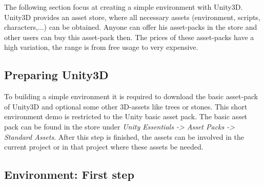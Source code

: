 \documentclass[conference]{IEEEtran}
\begin{document}
The following section focus at creating a simple environment with Unity3D. 
Unity3D provides an asset store, where all necessary assets (environment, scripts, characters,...) can be obtained. Anyone can offer his asset-packs in the store and other users can buy this asset-pack then. The prices of these asset-packs have a high variation, the range is from free usage to very expensive. 

\subsection{Preparing Unity3D}

To building a simple environment it is required to download the basic asset-pack of Unity3D and optional some other 3D-assets like trees or stones. This short environment demo is restricted to the Unity basic asset pack. The basic asset pack can be found in the store under \emph{Unity Essentials -> Asset Packs -> Standard Assets}.
After this step is finished, the assets can be involved in the current project or in that project where these assets be needed.

 
\subsection{Environment: First step}
\end{document}
